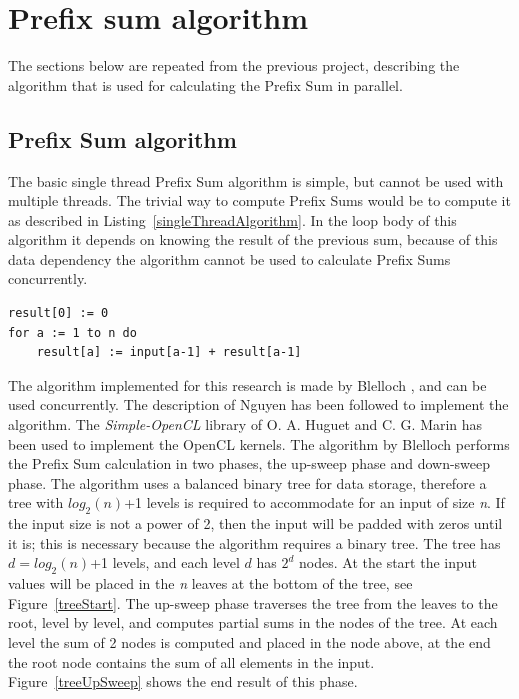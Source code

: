 \documentclass[a4paper]{article}
\begin{document}
\section{Prefix sum algorithm}\label{chapter:prefixSum}
The sections below are repeated from the previous project\cite{bachelorThesis}, describing the algorithm that is used for calculating the Prefix Sum in parallel.

\subsection{Prefix Sum algorithm} \label{implementBasic}
The basic single thread Prefix Sum algorithm is simple, but cannot be used with multiple threads. The trivial way to compute Prefix Sums would be to compute it as described in Listing~\ref{singleThreadAlgorithm}. In the loop body of this algorithm it depends on knowing the result of the previous sum, because of this data dependency the algorithm cannot be used to calculate Prefix Sums concurrently. 

\begin{lstlisting}[caption=Single thread Prefix Sum, label=singleThreadAlgorithm, float=htpb]
result[0] := 0
for a := 1 to n do  
	result[a] := input[a-1] + result[a-1]
\end{lstlisting}

The algorithm implemented for this research is made by Blelloch \cite{Blelloch:PrefixSum}, and can be used concurrently. The description of Nguyen \cite{Nguyen:GPUGems3} has been followed to implement the algorithm. The \emph{Simple-OpenCL} library \cite{Huguet:SimpleCL} of O. A. Huguet and C. G. Marin has been used to implement the OpenCL kernels. The algorithm by Blelloch performs the Prefix Sum calculation in two phases, the up-sweep phase and down-sweep phase. The algorithm uses a balanced binary tree for data storage, therefore a tree with $log_2(n)$+1 levels is required to accommodate for an input of size \emph{n}. If the input size is not a power of 2, then the input will be padded with zeros until it is; this is necessary because the algorithm requires a binary tree. The tree has $d=log_2(n)$+1 levels, and each level $d$ has $2^d$ nodes. At the start the input values will be placed in the \emph{n} leaves at the bottom of the tree, see Figure~\ref{treeStart}. The up-sweep phase traverses the tree from the leaves to the root, level by level, and computes partial sums in the nodes of the tree. At each level the sum of 2 nodes is computed and placed in the node above, at the end the root node contains the sum of all elements in the input. Figure~\ref{treeUpSweep} shows the end result of this phase.
\end{document}
